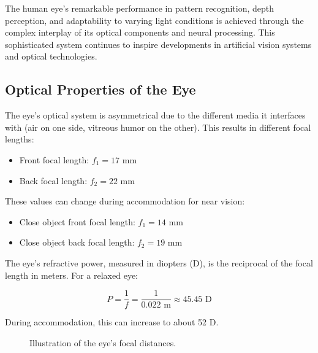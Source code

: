 \documentclass[
  a4paper,
]{book}
\providecommand{\tightlist}{%
  \setlength{\itemsep}{0pt}\setlength{\parskip}{0pt}}
\begin{document}
The human eye's remarkable performance in pattern recognition, depth
perception, and adaptability to varying light conditions is achieved
through the complex interplay of its optical components and neural
processing. This sophisticated system continues to inspire developments
in artificial vision systems and optical technologies.

\subsection{Optical Properties of the
Eye}\label{optical-properties-of-the-eye}

The eye's optical system is asymmetrical due to the different media it
interfaces with (air on one side, vitreous humor on the other). This
results in different focal lengths:

\begin{itemize}
\tightlist
\item
  Front focal length: \(f_1 = 17\) mm
\item
  Back focal length: \(f_2 = 22\) mm
\end{itemize}

These values can change during accommodation for near vision:

\begin{itemize}
\tightlist
\item
  Close object front focal length: \(f_1 = 14\) mm
\item
  Close object back focal length: \(f_2 = 19\) mm
\end{itemize}

The eye's refractive power, measured in diopters (D), is the reciprocal
of the focal length in meters. For a relaxed eye:

\[P = \frac{1}{f} = \frac{1}{0.022 \text{ m}} \approx 45.45 \text{ D}\]

During accommodation, this can increase to about 52 D.

\begin{figure}


\caption{\label{fig-eye-focal-distance}Illustration of the eye's focal
distances.}

\end{figure}%
\end{document}
